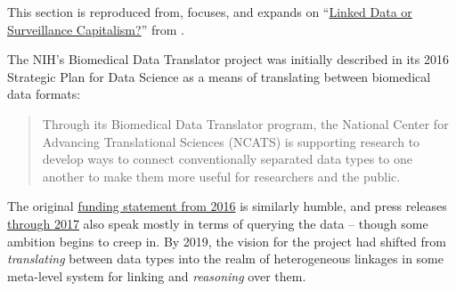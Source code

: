 This section is reproduced from, focuses, and expands on
``\href{https://jon-e.net/infrastructure/\#linked-data-or-surveillance-capitalism}{Linked
Data or Surveillance Capitalism?}'' from \cite{saundersDecentralizedInfrastructureNeuro2022} .

The NIH's Biomedical Data Translator
project was initially described in its 2016 Strategic Plan for Data
Science as a means of translating between biomedical data formats:

\begin{quote}
Through its Biomedical Data Translator program, the National Center for
Advancing Translational Sciences (NCATS) is supporting research to
develop ways to connect conventionally separated data types to one
another to make them more useful for researchers and the public. \cite{NIHStrategicPlan2018} 
\end{quote}

The original
\href{https://web.archive.org/web/20210709100523/https://ncats.nih.gov/news/releases/2016/feasibility-assessment-translator}{funding
statement from 2016} is similarly humble, and press releases
\href{https://web.archive.org/web/20210709171335/https://ncats.nih.gov/pubs/features/translator}{through
2017} also speak mostly in terms of querying the data -- though some
ambition begins to creep in. By 2019, the vision for the project had
shifted from \emph{translating} between data types into the realm of
heterogeneous linkages in some meta-level system for linking and
\emph{reasoning} over them.

